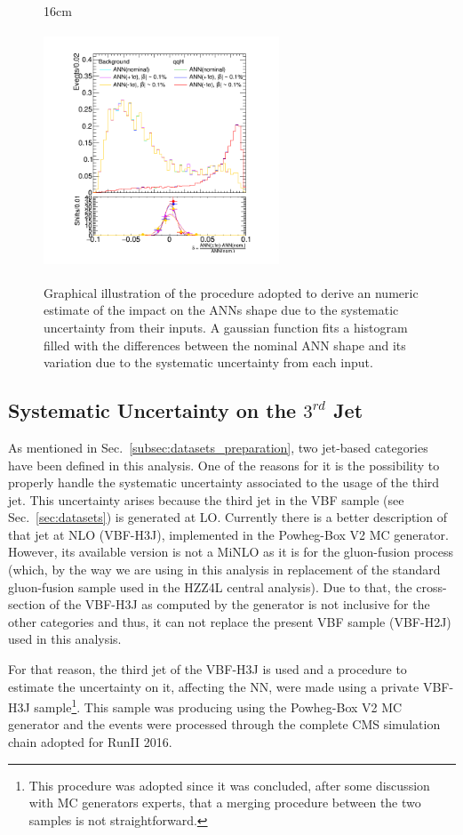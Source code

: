 \begin{figure}[hbtp]{16cm}
	\caption{Graphical illustration of the procedure adopted to derive an numeric estimate of the impact on the ANNs shape due to the systematic uncertainty from their inputs. A gaussian function fits a histogram filled with the differences between the nominal ANN shape and its variation due to the systematic uncertainty from each input.}
	\centering
	\includegraphics[width=7cm,height=7cm,trim={3cm 0cm 0cm 1cm},clip]{ChapterAnalysis/figs/k57nj2_uncertainty_j1pt}
	\label{fig:ann_syst_means}
\end{figure}

\subsection{Systematic Uncertainty on the $3^{rd}$ Jet}
As mentioned in Sec.~\ref{subsec:datasets_preparation}, two jet-based categories have been defined in this analysis. One of the reasons for it is the possibility to properly handle the systematic uncertainty associated to the usage of the third jet. This uncertainty arises because the third jet in the VBF sample (see Sec.~\ref{sec:datasets}) is generated at LO. Currently there is a better description of that jet at NLO (VBF-H3J), implemented in the Powheg-Box V2 MC generator. However, its available version is not a MiNLO as it is for the gluon-fusion process (which, by the way we are using in this analysis in replacement of the standard gluon-fusion sample used in the HZZ4L central analysis). Due to that, the cross-section of the VBF-H3J as computed by the generator is not inclusive for the other categories and thus, it can not replace the present VBF sample (VBF-H2J) used in this analysis.

For that reason, the third jet of the VBF-H3J is used and a procedure to estimate the uncertainty on it, affecting the NN, were made using a private VBF-H3J sample\footnote{This procedure was adopted since it was concluded, after some discussion with MC generators experts, that a merging procedure between the two samples is not straightforward.}. This sample was producing using the Powheg-Box V2 MC generator and the events were processed through the complete CMS simulation chain adopted for RunII 2016.

